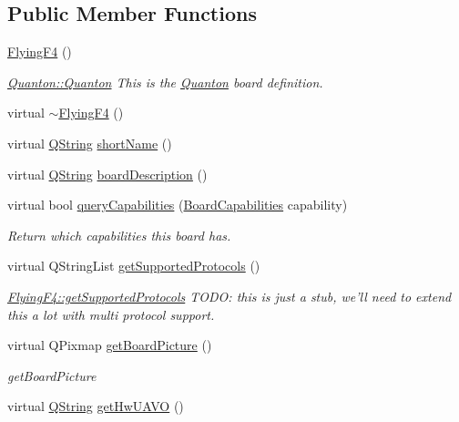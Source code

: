 \subsection*{Public Member Functions}
\begin{DoxyCompactItemize}
\item 
\hyperlink{group___boards___stm_ga520fa9de4d28a0754a9ea798a89e3b56}{Flying\-F4} ()
\begin{DoxyCompactList}\small\item\em \hyperlink{group___boards___quantec_ga39ce601b1744d463fc4a56681c46135f}{Quanton\-::\-Quanton} This is the \hyperlink{class_quanton}{Quanton} board definition. \end{DoxyCompactList}\item 
virtual \hyperlink{group___boards___stm_ga901ea50bfeb75a8d451c5fa8f303f8b5}{$\sim$\-Flying\-F4} ()
\item 
virtual \hyperlink{group___u_a_v_objects_plugin_gab9d252f49c333c94a72f97ce3105a32d}{Q\-String} \hyperlink{group___boards___stm_ga779f6089f1d7444e4a5aad46aa1eec56}{short\-Name} ()
\item 
virtual \hyperlink{group___u_a_v_objects_plugin_gab9d252f49c333c94a72f97ce3105a32d}{Q\-String} \hyperlink{group___boards___stm_gaf26e4b2a68ac23e2d7aaa38e1efedc61}{board\-Description} ()
\item 
virtual bool \hyperlink{group___boards___stm_gae8c3f46dea83e638e7b1e9c00658cae6}{query\-Capabilities} (\hyperlink{group___core_plugin_ga01b09218f2a13aaeee6db007ac6bd967}{Board\-Capabilities} capability)
\begin{DoxyCompactList}\small\item\em Return which capabilities this board has. \end{DoxyCompactList}\item 
virtual Q\-String\-List \hyperlink{group___boards___stm_ga414c6ad3220b62ad6230c97f000bfbac}{get\-Supported\-Protocols} ()
\begin{DoxyCompactList}\small\item\em \hyperlink{group___boards___stm_ga414c6ad3220b62ad6230c97f000bfbac}{Flying\-F4\-::get\-Supported\-Protocols} T\-O\-D\-O\-: this is just a stub, we'll need to extend this a lot with multi protocol support. \end{DoxyCompactList}\item 
virtual Q\-Pixmap \hyperlink{group___boards___stm_ga8d3b2a7f81995719e2f8822e5cb8d97f}{get\-Board\-Picture} ()
\begin{DoxyCompactList}\small\item\em get\-Board\-Picture \end{DoxyCompactList}\item 
virtual \hyperlink{group___u_a_v_objects_plugin_gab9d252f49c333c94a72f97ce3105a32d}{Q\-String} \hyperlink{group___boards___stm_ga08faac554f32814ae7d1b13cd06ae759}{get\-Hw\-U\-A\-V\-O} ()
\end{DoxyCompactItemize}
